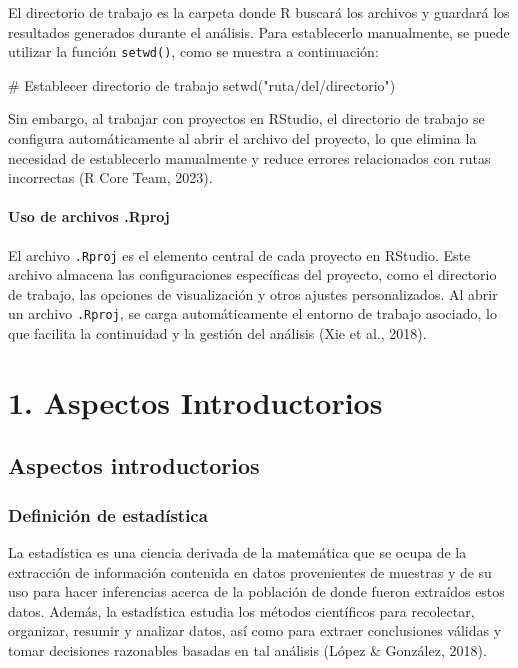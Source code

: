 \documentclass[
  spanish,
  letterpaper,
]{book}
\newenvironment{Shaded}{\begin{snugshade}}{\end{snugshade}}
\newcommand{\CommentTok}[1]{\textcolor[rgb]{0.37,0.37,0.37}{#1}}
\newcommand{\FunctionTok}[1]{\textcolor[rgb]{0.28,0.35,0.67}{#1}}
\newcommand{\NormalTok}[1]{\textcolor[rgb]{0.00,0.23,0.31}{#1}}
\newcommand{\StringTok}[1]{\textcolor[rgb]{0.13,0.47,0.30}{#1}}
\begin{document}
El directorio de trabajo es la carpeta donde R buscará los archivos y
guardará los resultados generados durante el análisis. Para establecerlo
manualmente, se puede utilizar la función \texttt{setwd()}, como se
muestra a continuación:

\begin{Shaded}
\begin{Highlighting}[]
\CommentTok{\# Establecer directorio de trabajo}
\FunctionTok{setwd}\NormalTok{(}\StringTok{"ruta/del/directorio"}\NormalTok{)}
\end{Highlighting}
\end{Shaded}

Sin embargo, al trabajar con proyectos en RStudio, el directorio de
trabajo se configura automáticamente al abrir el archivo del proyecto,
lo que elimina la necesidad de establecerlo manualmente y reduce errores
relacionados con rutas incorrectas (R Core Team, 2023).

\subsection{Uso de archivos .Rproj}\label{uso-de-archivos-.rproj}

El archivo \texttt{.Rproj} es el elemento central de cada proyecto en
RStudio. Este archivo almacena las configuraciones específicas del
proyecto, como el directorio de trabajo, las opciones de visualización y
otros ajustes personalizados. Al abrir un archivo \texttt{.Rproj}, se
carga automáticamente el entorno de trabajo asociado, lo que facilita la
continuidad y la gestión del análisis (Xie et al., 2018).

\part{1. Aspectos Introductorios}


\chapter{Aspectos introductorios}\label{aspectos-introductorios-1}

\section{Definición de
estadística}\label{definiciuxf3n-de-estaduxedstica}

La estadística es una ciencia derivada de la matemática que se ocupa de
la extracción de información contenida en datos provenientes de muestras
y de su uso para hacer inferencias acerca de la población de donde
fueron extraídos estos datos. Además, la estadística estudia los métodos
científicos para recolectar, organizar, resumir y analizar datos, así
como para extraer conclusiones válidas y tomar decisiones razonables
basadas en tal análisis (López \& González, 2018).
\end{document}
